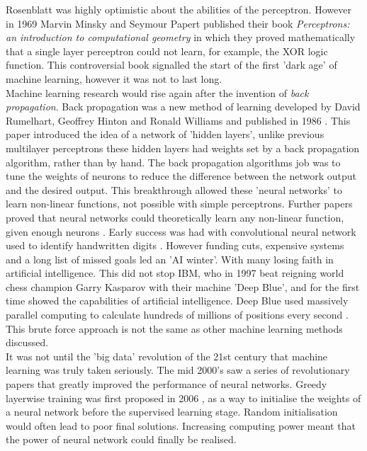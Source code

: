 Rosenblatt was highly optimistic about the abilities of the perceptron. However in 1969 Marvin Minsky and Seymour Papert published their book \textit{Perceptrons: an introduction to computational geometry} \cite{Minsky1969Perceptrons:Geometry} in which they proved mathematically that a single layer perceptron could not learn, for example, the XOR logic function. This controversial book signalled the start of the first 'dark age' of machine learning, however it was not to last long.\\
Machine learning research would rise again after the invention of \textit{back propagation}. Back propagation was a new method of learning developed by David Rumelhart, Geoffrey Hinton  and Ronald Williams and published in 1986 \cite{Rumelhart1986LearningErrors}. This paper introduced the idea of a network of 'hidden layers', unlike previous multilayer perceptrons these hidden layers had weights set by a back propagation algorithm, rather than by hand. The back propagation algorithms job was to tune the weights of neurons to reduce the difference between the network output and the desired output. This breakthrough allowed these 'neural networks' to learn non-linear functions, not possible with simple perceptrons. Further papers proved that neural networks could theoretically learn any non-linear function, given enough neurons \cite{Hornik1991ApproximationNetworks}. Early success was had with convolutional neural network used to identify handwritten digits \cite{LeCun1990HandwrittenNetwork}. However funding cuts, expensive systems and a long list of missed goals led an 'AI winter'. With many losing faith in artificial intelligence. This did not stop IBM, who in 1997 beat reigning world chess champion Garry Kasparov with their machine 'Deep Blue', and for the first time showed the capabilities of artificial intelligence. Deep Blue used massively parallel computing to calculate hundreds of millions of positions every second \cite{Campbell2002DeepBlue}. This brute force approach is not the same as other machine learning methods discussed.\\
It was not until the 'big data' revolution of the 21st century that machine learning was truly taken seriously. The mid 2000's saw a series of revolutionary papers that greatly improved the performance of neural networks. Greedy layerwise training was first proposed in 2006 \cite{Bengio2006GreedyNetworks}, as a way to initialise the weights of a neural network before the supervised learning stage. Random initialisation would often lead to poor final solutions. Increasing computing power meant that the power of neural network could finally be realised.


